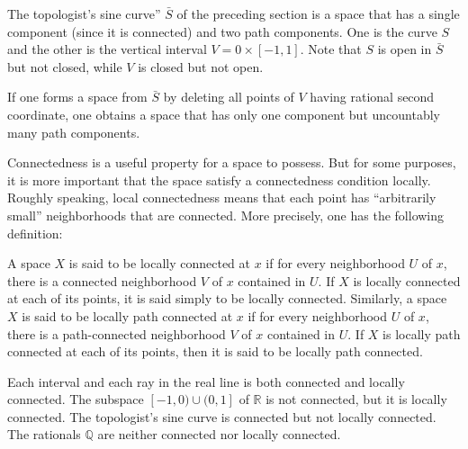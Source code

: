 \begin{centeredblock}
\begin{example}
\label{ex:\thesection.\theexample}
 The topologist's sine curve'' \(\bar{S}\) of the preceding section is a space that has a single component (since it is connected) and two path components. One  is the curve \(S\) and the other is the vertical interval \(V = 0 \times [ {-1,1}]\). Note that \(S\) is open in \(\bar{S}\) but not closed, while \(V\) is closed but not open.

If one forms a space from \(\bar{S}\) by deleting all points of \(V\) having rational second coordinate, one obtains a space that has only one component but uncountably many path components.
\end{example}
\end{centeredblock}

Connectedness is a useful property for a space to possess. But for some purposes, it is more important that the space satisfy a connectedness condition locally. Roughly speaking, local connectedness means that each point has ``arbitrarily small'' neighborhoods that are connected. More precisely, one has the following definition:

\begin{definition}
 A space \(X\) is said to be locally connected at \(x\) if for every neighborhood \(U\) of \(x\), there is a connected neighborhood \(V\) of \(x\) contained in \(U\). If \(X\) is locally connected at each of its points, it is said simply to be locally connected. Similarly, a space \(X\) is said to be locally path connected at \(x\) if for every neighborhood \(U\) of \(x\), there is a path-connected neighborhood \(V\) of \(x\) contained in \(U\). If \(X\) is locally path connected at each of its points, then it is said to be locally path connected.
\end{definition}

\begin{centeredblock}
\begin{example}
\label{ex:\thesection.\theexample}
 Each interval and each ray in the real line is both connected and locally connected. The subspace \([ {-1,0)\cup (0,1}]\) of \(\mathbb{R}\) is not connected, but it is locally connected. The topologist's sine curve is connected but not locally connected. The rationals \(\mathbb{Q}\) are neither connected nor locally connected.
\end{example}
\end{centeredblock}

